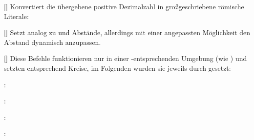 []
Konvertiert die übergebene positive Dezimalzahl in großgeschriebene römische Literale:
\begin{latex*}
\end{latex*}

%
%
%

[\cmdlist{}]
Setzt analog zu  und  Abstände, allerdings mit einer angepassten Möglichkeit den Abstand dynamisch anzupassen.

%
%
%

[\cmdlist{}\cmdlist{}\cmdlist\secline{}]
Diese Befehle funktionieren nur in einer -entsprechenden Umgebung (wie ) und setzten entsprechend Kreise, im Folgenden wurden sie jeweils durch  gesetzt: \vspace{-0.75\baselineskip}
\begin{multicols}{2}%
    \begin{ditemize}\narrowitems
        \item {}: 
        \item {}: 
        \item {}: 
        \item {}: 
    \end{ditemize}
\end{multicols}

%
%
%

